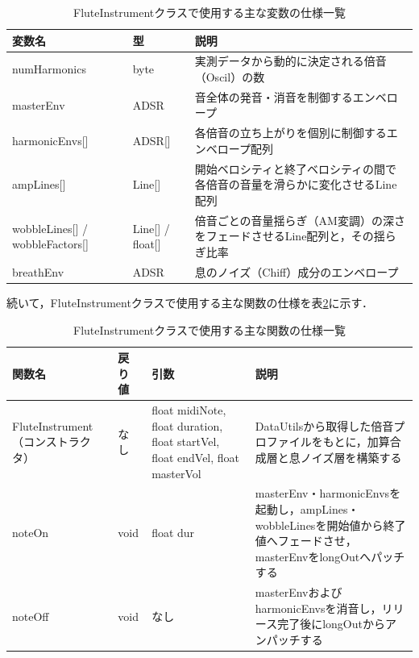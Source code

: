 \begin{table}[H]
    \caption{FluteInstrumentクラスで使用する主な変数の仕様一覧}
    \centering
    \label{table:gakki_flute_var}
    \begin{tabular}{p{3.9cm}p{3.4cm}p{6.2cm}}
    \hline
    \textbf{変数名} & \textbf{型} & \textbf{説明}\\
    \hline
    numHarmonics & byte & 実測データから動的に決定される倍音（Oscil）の数\\
    \hline
    masterEnv & ADSR & 音全体の発音・消音を制御するエンベロープ\\
    \hline
    harmonicEnvs[] & ADSR[] & 各倍音の立ち上がりを個別に制御するエンベロープ配列\\
    \hline
    ampLines[] & Line[] & 開始ベロシティと終了ベロシティの間で各倍音の音量を滑らかに変化させるLine配列\\
    \hline
    wobbleLines[] / wobbleFactors[] & Line[] / float[] & 倍音ごとの音量揺らぎ（AM変調）の深さをフェードさせるLine配列と，その揺らぎ比率\\
    \hline
    breathEnv & ADSR & 息のノイズ（Chiff）成分のエンベロープ\\
    \hline
    \end{tabular}
\end{table}

続いて，FluteInstrumentクラスで使用する主な関数の仕様を表\ref{table:gakki_flute_func}に示す．

\begin{table}[H]
    \caption{FluteInstrumentクラスで使用する主な関数の仕様一覧}
    \centering
    \label{table:gakki_flute_func}
    \begin{tabular}{p{3.3cm}p{2cm}p{4.2cm}p{4cm}}
    \hline
    \textbf{関数名} & \textbf{戻り値} & \textbf{引数} & \textbf{説明}\\
    \hline
    FluteInstrument（コンストラクタ） & なし & float midiNote, float duration, float startVel, float endVel, float masterVol & DataUtilsから取得した倍音プロファイルをもとに，加算合成層と息ノイズ層を構築する\\
    \hline
    noteOn & void & float dur & masterEnv・harmonicEnvsを起動し，ampLines・wobbleLinesを開始値から終了値へフェードさせ，masterEnvをlongOutへパッチする\\
    \hline
    noteOff & void & なし & masterEnvおよびharmonicEnvsを消音し，リリース完了後にlongOutからアンパッチする\\
    \hline
    \end{tabular}
\end{table}

